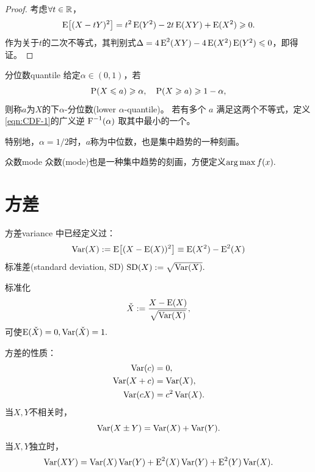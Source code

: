 \begin{proof}
	考虑$\forall t \in \RR$，
	\[
		\E\bigb{(X - tY)^2} = t^2\E(Y^2) - 2t\E(XY) + \E(X^2) \geqslant 0.
	\]
	作为关于$t$的二次不等式，其判别式$\Delta = 4\E^2(XY) - 4\E(X^2)\E(Y^2) \leqslant 0$，即得证。
\end{proof}

\begin{definition}{分位数}{quantile}
	给定$\alpha \in (0,1)$，若
	\begin{equation}\label{eq:ps-quantile}
		\P(X \leqslant a) \geqslant \alpha,\quad\P(X \geqslant a) \geqslant 1 - \alpha,
	\end{equation}
	则称$a$为$X$的下$\alpha$-分位数(lower $\alpha$-quantile)。
	若有多个 $a$ 满足这两个不等式，定义\eqref{eqn:CDF-1}的广义逆 $\CDF\inv(\alpha)$ 取其中最小的一个。

	特别地，$\alpha = 1/2$时，$a$称为中位数，也是集中趋势的一种刻画。
\end{definition}

\begin{definition}
	{众数}{mode}
	众数(mode)也是一种集中趋势的刻画，方便定义$\argmax f(x).$
\end{definition}

\section{方差}

\begin{definition}
	{方差}{variance}
	 中已经定义过：
	\begin{equation}
		\Var(X) := \E\bigb{(X - \E(X))^2} \equiv \E(X^2) - \E^2(X)
	\end{equation}
	标准差(standard deviation, SD) $\SD(X) := \sqrt{\Var(X)}.$
\end{definition}

\begin{corollary}
	标准化
	\begin{equation}
		\check X := \frac{X - \E(X)}{\sqrt{\Var(X)}},
	\end{equation}
	可使$\E(\check X) = 0,\Var(\check X) = 1.$
\end{corollary}

\begin{corollary}
	方差的性质：
	\begin{subequations}
		\begin{align}
			\Var(c) &= 0,\\
			\Var(X + c) &= \Var(X),\\
			\Var(cX) &= c^2\Var(X).
		\end{align}
	\end{subequations}
	当$X,Y$不相关时，
	\begin{equation}
		\Var(X \pm Y) = \Var(X) + \Var(Y).
	\end{equation}
	当$X,Y$独立时，
	\begin{equation}
		\Var(XY) = \Var(X)\Var(Y) + \E^2(X)\Var(Y) + \E^2(Y)\Var(X).
	\end{equation}
\end{corollary}

